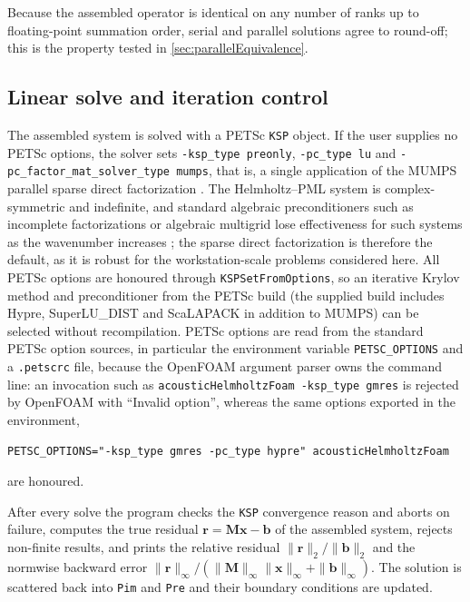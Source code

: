 \documentclass[final,12pt,nopreprintline]{elsarticle}
\newcommand{\code}[1]{\texttt{#1}}
\begin{document}
Because the assembled operator is identical on any number of ranks up to
floating-point summation order, serial and parallel solutions agree to
round-off; this is the property tested in \cref{sec:parallelEquivalence}.

\subsection{Linear solve and iteration control}
\label{sec:linearSolve}

The assembled system is solved with a PETSc \code{KSP} object.  If the user
supplies no PETSc options, the solver sets \code{-ksp\_type preonly},
\code{-pc\_type lu} and \code{-pc\_factor\_mat\_solver\_type mumps}, that is,
a single application of the MUMPS parallel sparse direct factorization
\cite{Amestoy2001,Amestoy2019}.  The Helmholtz--PML system is complex-symmetric
and indefinite, and standard algebraic preconditioners such as incomplete
factorizations or algebraic multigrid lose effectiveness for such systems as
the wavenumber increases \cite{ErnstGander2012}; the sparse direct
factorization is therefore the default, as it is robust for the
workstation-scale problems considered here.  All PETSc options are honoured
through \code{KSPSetFromOptions}, so an iterative Krylov method and preconditioner
from the PETSc build (the supplied build includes Hypre, SuperLU\_DIST and
ScaLAPACK in addition to MUMPS) can be selected without recompilation.  PETSc
options are read from the standard PETSc option sources, in particular the
environment variable \code{PETSC\_OPTIONS} and a \code{.petscrc} file, because
the OpenFOAM argument parser owns the command line: an invocation such as
\code{acousticHelmholtzFoam -ksp\_type gmres} is rejected by OpenFOAM with
``Invalid option'', whereas the same options exported in the environment,
{\small
\begin{verbatim}
PETSC_OPTIONS="-ksp_type gmres -pc_type hypre" acousticHelmholtzFoam
\end{verbatim}}
\noindent are honoured.

After every solve the program checks the \code{KSP} convergence reason and
aborts on failure, computes the true residual $\mathbf{r}=\mathbf{M}\mathbf{x}-\mathbf{b}$
of the assembled system, rejects non-finite results, and prints the relative
residual $\|\mathbf{r}\|_2/\|\mathbf{b}\|_2$ and the normwise backward error
$\|\mathbf{r}\|_\infty/(\|\mathbf{M}\|_\infty\|\mathbf{x}\|_\infty+\|\mathbf{b}\|_\infty)$.
The solution is scattered back into \code{Pim} and \code{Pre} and their
boundary conditions are updated.
\end{document}
